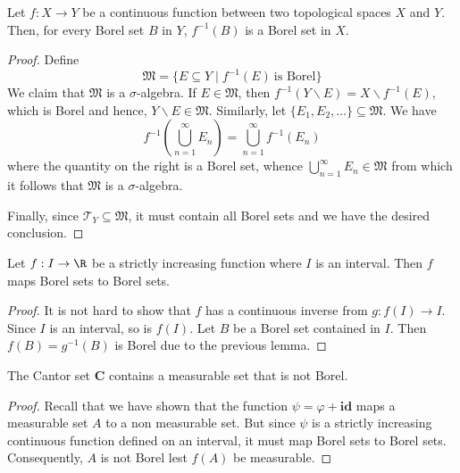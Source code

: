 \begin{lemma}
    Let $f: X\to Y$ be a continuous function between two topological spaces $X$ and $Y$. Then, for every Borel set $B$ in $Y$, $f^{-1}(B)$ is a Borel set in $X$.
\end{lemma}
\begin{proof}
    Define 
    \begin{equation*}
        \mathfrak M = \{E\subseteq Y\mid f^{-1}(E)~\text{is Borel}\}
    \end{equation*}
    We claim that $\mathfrak M$ is a $\sigma$-algebra. If $E\in\mathfrak M$, then $f^{-1}(Y\backslash E) = X\backslash f^{-1}(E)$, which is Borel and hence, $Y\backslash E\in\mathfrak M$. Similarly, let $\{E_1, E_2,\ldots\}\subseteq\mathfrak M$. We have 
    \begin{equation*}
        f^{-1}\left(\bigcup_{n = 1}^\infty E_n\right) = \bigcup_{n = 1}^\infty f^{-1}(E_n)
    \end{equation*}
    where the quantity on the right is a Borel set, whence $\bigcup\limits_{n = 1}^\infty E_n\in\mathfrak M$ from which it follows that $\mathfrak M$ is a $\sigma$-algebra.

    Finally, since $\mathcal T_Y\subseteq\mathfrak M$, it must contain all Borel sets and we have the desired conclusion.
\end{proof}

\begin{lemma}
    Let $f: I\to\R$ be a strictly increasing function where $I$ is an interval. Then $f$ maps Borel sets to Borel sets.
\end{lemma}
\begin{proof}
    It is not hard to show that $f$ has a continuous inverse from $g:f(I)\to I$. Since $I$ is an interval, so is $f(I)$. Let $B$ be a Borel set contained in $I$. Then $f(B) = g^{-1}(B)$ is Borel due to the previous lemma.
\end{proof}

\begin{theorem}
    The Cantor set $\mathbf C$ contains a measurable set that is not Borel.
\end{theorem}
\begin{proof}
    Recall that we have shown that the function $\psi = \varphi + \mathbf{id}$ maps a measurable set $A$ to a non measurable set. But since $\psi$ is a strictly increasing continuous function defined on an interval, it must map Borel sets to Borel sets. Consequently, $A$ is not Borel lest $f(A)$ be measurable.
\end{proof}

